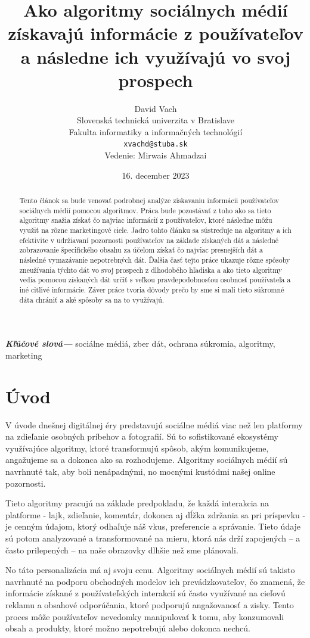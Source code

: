 \documentclass[12pt,twoside,slovak,a4paper]{article}
\title{Ako algoritmy sociálnych médií získavajú informácie 
z používateľov a následne ich využívajú vo svoj 
prospech}
\author{David Vach\\
	{\small Slovenská technická univerzita v Bratislave}\\
	{\small Fakulta informatiky a informačných technológií}\\
	{\small \texttt{xvachd@stuba.sk}}\\
	{\small Vedenie: Mirwais Ahmadzai}
}
\date{\small 16. december 2023}
\newcommand{\keywords}[1]{
  \small	
  \textbf{\textit{Kľúčové slová---}} #1
}
\begin{document}
\maketitle

\begin{abstract}
Tento článok sa bude venovať podrobnej analýze získavaniu informácii používateľov sociálnych médií pomocou algoritmov. Práca bude pozostávať z toho ako sa tieto algoritmy snažia získať čo najviac informácií z používateľov, ktoré následne môžu využiť na rôzne marketingové ciele. Jadro tohto článku sa sústreďuje na algoritmy a ich efektivite v udržiavaní pozornosti používateľov na základe získaných dát a následné zobrazovanie špecifického obsahu za účelom získať čo najviac presnejších dát a následné vymazávanie nepotrebných dát. Ďalšia časť tejto práce ukazuje rôzne spôsoby zneužívania týchto dát vo svoj prospech z dlhodobého hľadiska a ako tieto algoritmy vedia pomocou získaných dát určiť s veľkou pravdepodobnosťou osobnosť používateľa a iné citlivé informácie. Záver práce tvoria dôvody prečo by sme si mali tieto súkromné dáta chrániť a aké spôsoby sa na to využívajú.
\end{abstract}

\keywords{sociálne médiá, zber dát, ochrana súkromia, algoritmy, marketing}

\newpage
\section{Úvod}


V úvode dnešnej digitálnej éry predstavujú sociálne médiá viac než len platformy na zdieľanie osobných príbehov a fotografií. Sú to sofistikované ekosystémy využívajúce algoritmy, ktoré transformujú spôsob, akým komunikujeme, angažujeme sa a dokonca ako sa rozhodujeme. Algoritmy sociálnych médií sú navrhnuté tak, aby boli nenápadnými, no mocnými kustódmi našej online pozornosti.

Tieto algoritmy pracujú na základe predpokladu, že každá interakcia na platforme - lajk, zdieľanie, komentár, dokonca aj dĺžka zdržania sa pri príspevku - je cenným údajom, ktorý odhaľuje náš vkus, preferencie a správanie. Tieto údaje sú potom analyzované a transformované na mieru, ktorá nás drží zapojených – a často prilepených – na naše obrazovky dlhšie než sme plánovali.

No táto personalizácia má aj svoju cenu. Algoritmy sociálnych médií sú takisto navrhnuté na podporu obchodných modelov ich prevádzkovateľov, čo znamená, že informácie získané z používateľských interakcií sú často využívané na cieľovú reklamu a obsahové odporúčania, ktoré podporujú angažovanosť a zisky. Tento proces môže používateľov nevedomky manipulovať k tomu, aby konzumovali obsah a produkty, ktoré možno nepotrebujú alebo dokonca nechcú.
\end{document}
